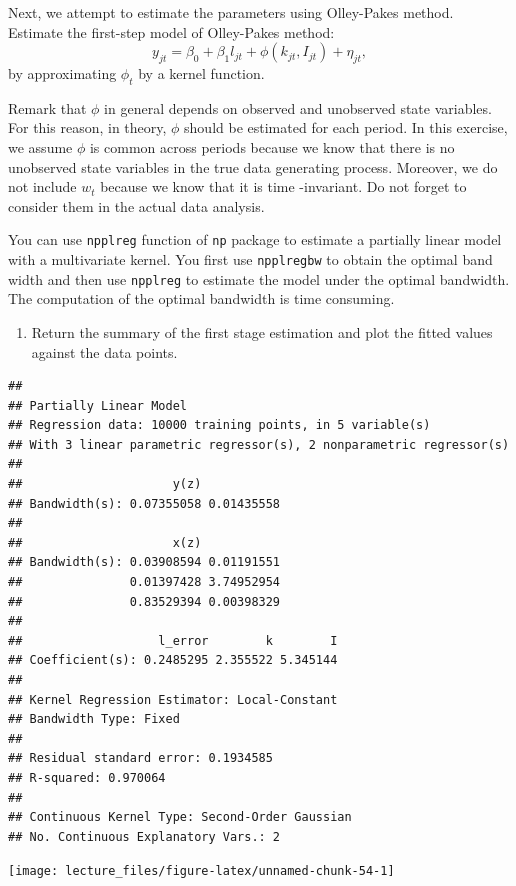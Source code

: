 \documentclass[]{book}
\providecommand{\tightlist}{%
  \setlength{\itemsep}{0pt}\setlength{\parskip}{0pt}}
\begin{document}
Next, we attempt to estimate the parameters using Olley-Pakes method.
Estimate the first-step model of Olley-Pakes method: \[
y_{jt} = \beta_0 + \beta_1 l_{jt} + \phi(k_{jt}, I_{jt}) + \eta_{jt},
\] by approximating \(\phi_t\) by a kernel function.

Remark that \(\phi\) in general depends on observed and unobserved state
variables. For this reason, in theory, \(\phi\) should be estimated for
each period. In this exercise, we assume \(\phi\) is common across
periods because we know that there is no unobserved state variables in
the true data generating process. Moreover, we do not include \(w_t\)
because we know that it is time -invariant. Do not forget to consider
them in the actual data analysis.

You can use \texttt{npplreg} function of \texttt{np} package to estimate
a partially linear model with a multivariate kernel. You first use
\texttt{npplregbw} to obtain the optimal band width and then use
\texttt{npplreg} to estimate the model under the optimal bandwidth. The
computation of the optimal bandwidth is time consuming.

\begin{enumerate}
\def\labelenumi{\arabic{enumi}.}
\setcounter{enumi}{2}
\tightlist
\item
  Return the summary of the first stage estimation and plot the fitted
  values against the data points.
\end{enumerate}

\begin{verbatim}
## 
## Partially Linear Model
## Regression data: 10000 training points, in 5 variable(s)
## With 3 linear parametric regressor(s), 2 nonparametric regressor(s)
## 
##                     y(z)           
## Bandwidth(s): 0.07355058 0.01435558
## 
##                     x(z)           
## Bandwidth(s): 0.03908594 0.01191551
##               0.01397428 3.74952954
##               0.83529394 0.00398329
## 
##                   l_error        k        I
## Coefficient(s): 0.2485295 2.355522 5.345144
## 
## Kernel Regression Estimator: Local-Constant
## Bandwidth Type: Fixed
## 
## Residual standard error: 0.1934585
## R-squared: 0.970064
## 
## Continuous Kernel Type: Second-Order Gaussian
## No. Continuous Explanatory Vars.: 2
\end{verbatim}

\begin{center}\texttt{[image: lecture\_files/figure-latex/unnamed-chunk-54-1]} \end{center}
\end{document}
